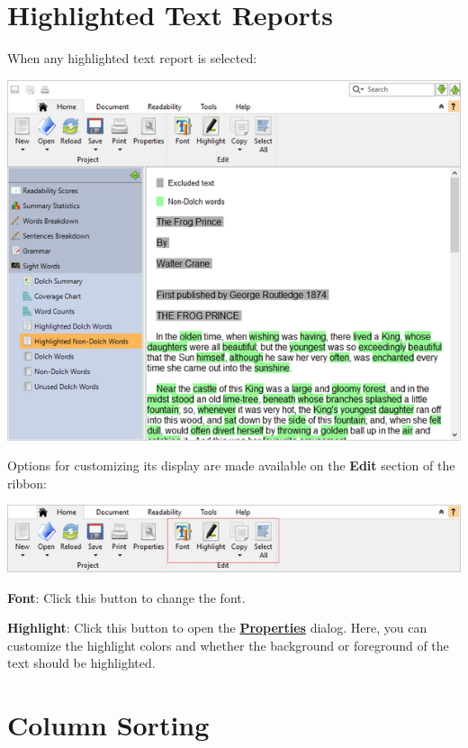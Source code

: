 \documentclass[
]{book}
\theoremstyle{definition}
\theoremstyle{definition}
\theoremstyle{definition}
\theoremstyle{definition}
\theoremstyle{remark}
\begin{document}
\hypertarget{highlighted-text-reports}{%
\section{Highlighted Text Reports}\label{highlighted-text-reports}}

When any highlighted text report is selected:

\includegraphics{Images/dolchhighlightednonwords.png}

Options for customizing its display are made available on the \textbf{Edit} section of the ribbon:

\includegraphics{Images/RibbonEditTextWindow.png}

\textbf{Font}: Click this button to change the font.

\textbf{Highlight}: Click this button to open the \protect\hyperlink{options-highlighted-reports}{\textbf{Properties}} dialog. Here, you can customize the highlight colors and whether the background or foreground of the text should be highlighted.

\hypertarget{column-sorting}{%
\section{Column Sorting}\label{column-sorting}}
\end{document}
